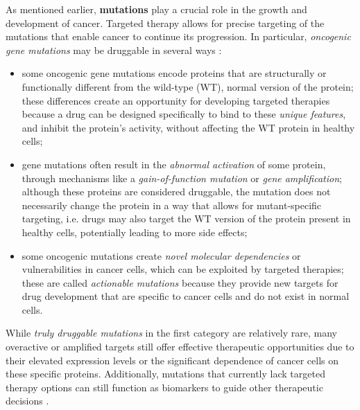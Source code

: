 As mentioned earlier, \textbf{mutations} play a crucial role in the growth and development of cancer. Targeted therapy allows for precise targeting of the mutations that enable cancer to continue its progression. In particular, \textit{oncogenic gene mutations} may be druggable in several ways \cite{jci}:

\begin{itemize}
    \item some oncogenic gene mutations encode proteins that are structurally or functionally different from the wild-type (WT), normal version of the protein; these differences create an opportunity for developing targeted therapies because a drug can be designed specifically to bind to these \textit{unique features}, and inhibit the protein's activity, without affecting the WT protein in healthy cells;
    \item gene mutations often result in the \textit{abnormal activation} of some protein, through mechanisms like a \textit{gain-of-function mutation} or \textit{gene amplification}; although these proteins are considered druggable, the mutation does not necessarily change the protein in a way that allows for mutant-specific targeting, i.e. drugs may also target the WT version of the protein present in healthy cells, potentially leading to more side effects;
    \item some oncogenic mutations create \textit{novel molecular dependencies} or vulnerabilities in cancer cells, which can be exploited by targeted therapies; these are called \textit{actionable mutations} because they provide new targets for drug development that are specific to cancer cells and do not exist in normal cells.
\end{itemize}

While \textit{truly druggable mutations} in the first category are relatively rare, many overactive or amplified targets still offer effective therapeutic opportunities due to their elevated expression levels or the significant dependence of cancer cells on these specific proteins. Additionally, mutations that currently lack targeted therapy options can still function as biomarkers to guide other therapeutic decisions \cite{jci}.

